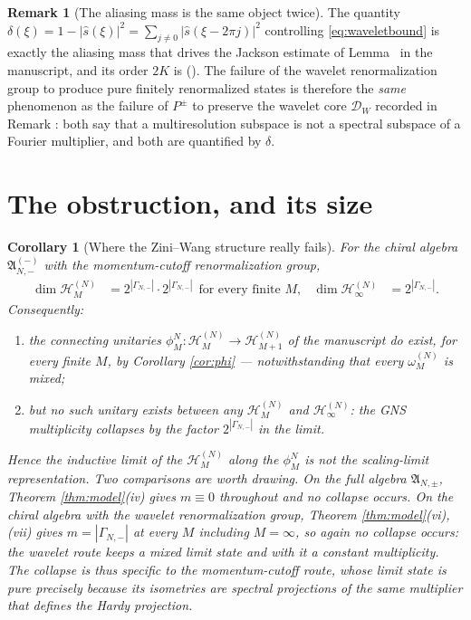 \documentclass[11pt,a4paper]{article}
\newtheorem{cor}[thm]{Corollary}
\theoremstyle{definition}
\newtheorem{rem}[thm]{Remark}
\newcommand{\fA}{\mathfrak{A}}
\newcommand{\cH}{\mathcal{H}}
\newcommand{\cD}{\mathcal{D}}
\newcommand{\1}{\mathds{1}}
\newcommand{\Gam}{\Gamma}
\begin{document}
\begin{rem}[The aliasing mass is the same object twice]
\label{rem:aliasing}
The quantity $\delta(\xi)=1-|\hat{s}(\xi)|^{2}=\sum_{j\neq0}|\hat{s}(\xi-2\pi j)|^{2}$ controlling
\eqref{eq:waveletbound} is exactly the aliasing mass that drives the Jackson estimate of
Lemma \mrJackson\ in the manuscript, and its order $2K$ is (\mrAlias). The failure of the wavelet
renormalization group to produce pure finitely renormalized states is therefore the \emph{same}
phenomenon as the failure of $P^{\pm}$ to preserve the wavelet core $\cD_{W}$ recorded in
Remark \mrMoeb: both say that a multiresolution subspace is not a spectral subspace of a Fourier
multiplier, and both are quantified by $\delta$.
\end{rem}

\section{The obstruction, and its size}
\label{sec:obstruction}

\begin{cor}[Where the Zini--Wang structure really fails]
\label{cor:obstruction}
For the chiral algebra $\fA^{(-)}_{N,-}$ with the momentum-cutoff renormalization group,
\begin{align}
\label{eq:dimcollapse}
\dim\cH^{(N)}_{M} & = 2^{|\Gam_{N,-}|}\cdot2^{|\Gam_{N,-}|}\ \ \text{for every finite }M,
 & \dim\cH^{(N)}_{\infty} & = 2^{|\Gam_{N,-}|}.
\end{align}
Consequently:
\begin{enumerate}
\item[(i)] the connecting unitaries $\phi^{N}_{M}:\cH^{(N)}_{M}\rightarrow\cH^{(N)}_{M+1}$ of the
manuscript \emph{do} exist, for every finite $M$, by Corollary \ref{cor:phi} --- notwithstanding
that every $\omega^{(N)}_{M}$ is mixed;
\item[(ii)] but no such unitary exists between any $\cH^{(N)}_{M}$ and $\cH^{(N)}_{\infty}$: the GNS
multiplicity collapses by the factor $2^{|\Gam_{N,-}|}$ in the limit.
\end{enumerate}
Hence the inductive limit of the $\cH^{(N)}_{M}$ along the $\phi^{N}_{M}$ is \emph{not} the
scaling-limit representation. Two comparisons are worth drawing. On the full algebra $\fA_{N,\pm}$, Theorem \ref{thm:model}(iv) gives $m\equiv0$ throughout and no collapse occurs. On the chiral algebra with the \emph{wavelet} renormalization group, Theorem \ref{thm:model}(vi),(vii) gives $m=|\Gam_{N,-}|$ at every $M$ \emph{including} $M=\infty$, so again no collapse occurs: the wavelet route keeps a mixed limit state and with it a constant multiplicity. The collapse is thus specific to the momentum-cutoff route, whose limit state is pure precisely because its isometries are spectral projections of the same multiplier that defines the Hardy projection.
\end{cor}
\end{document}
